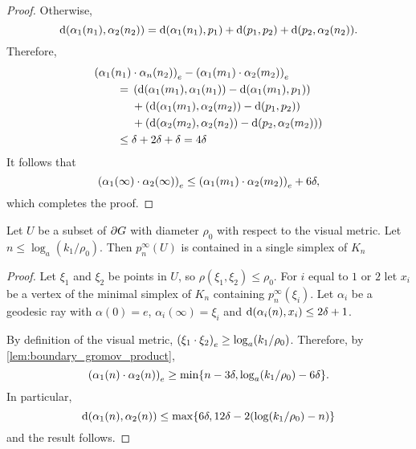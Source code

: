 \documentclass[a4paper]{article}
\begin{document}
\begin{proof}
  Otherwise,
  \begin{equation*}
    \dist(\alpha_1(n_1), \alpha_2(n_2)) = \dist(\alpha_1(n_1), p_1) +
        \dist(p_1, p_2) + \dist(p_2, \alpha_2(n_2)).
  \end{equation*}
  Therefore,
  \begin{align*}
    \mathrlap{\gromov{e}{\alpha_1(n_1)}{\alpha_n(n_2)} - \gromov{e}{\alpha_1(m_1)}{\alpha_2(m_2)}}
    \quad\quad\phantom{{}={}}&\\
           &\mathllap{{}={}}\left(\dist(\alpha_1(m_1), \alpha_1(n_1)) - \dist(\alpha_1(m_1), p_1)\right) \\
           &+ \left(\dist(\alpha_1(m_1), \alpha_2(m_2)) - \dist(p_1, p_2)\right) \\
           &+ \left(\dist(\alpha_2(m_2), \alpha_2(n_2)) - \dist(p_2, \alpha_2(m_2))\right) \\
           &\mathllap{{}\leq{}} \delta+2\delta+\delta=4\delta 
  \end{align*}
  It follows that
  \begin{equation*}
    \gromov{e}{\alpha_1(\infty)}{\alpha_2(\infty)} \leq \gromov{e}{\alpha_1(m_1)}{\alpha_2(m_2)} + 6\delta,
  \end{equation*}
  which completes the proof.
\end{proof}

\begin{lemma}\label{lem:projectstoasimplex}
  Let $U$ be a subset of $\boundary G$ with diameter $\rho_0$ with respect to
  the visual metric. Let $n \leq \log_a(k_1/\rho_0)$. Then $p^\infty_n(U)$ is
  contained in a single simplex of $K_n$
\end{lemma}

\begin{proof} 
  Let $\xi_1$ and $\xi_2$ be points in $U$, so $\rho(\xi_1, \xi_2)
  \leq \rho_0$.  For $i$ equal to $1$ or $2$ let $x_i$ be a vertex of the
  minimal simplex of $K_n$ containing $p^\infty_n(\xi_i)$. Let $\alpha_i$ be a
  geodesic ray with $\alpha(0) = e$, $\alpha_i(\infty) = \xi_i$ and
  $\dist(\alpha_i(n), x_i) \leq 2\delta+1$. 
  
  By definition of the visual metric, $\gromov{e}{\xi_1}{\xi_2} \geq
  \log_a(k_1/\rho_0)$. Therefore, by \cref{lem:boundary_gromov_product},
  \begin{equation*}
    \gromov{e}{\alpha_1(n)}{\alpha_2(n)} \geq \min\{n - 3\delta, \log_a(k_1/\rho_0) - 6\delta\}.
  \end{equation*}
  In particular,
  \begin{equation*}
    \dist(\alpha_1(n), \alpha_2(n)) \leq \max\{6\delta, 12\delta - 2(\log(k_1/\rho_0) - n)\}
  \end{equation*}
  and the result follows.
\end{proof}
\end{document}
